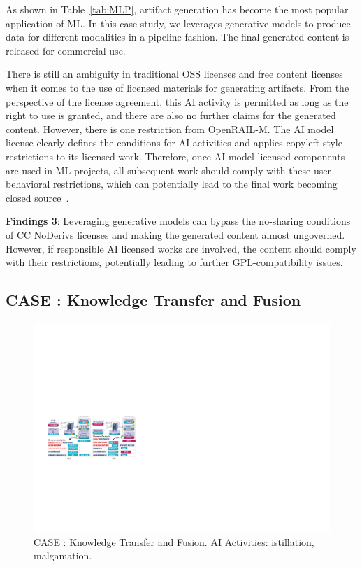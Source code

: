 As shown in Table~\ref{tab:MLP}, artifact generation has become the most popular application of ML.
In this case study, we leverages generative models to produce data for different modalities in a pipeline fashion.
The final generated content is released for commercial use.

There is still an ambiguity in traditional OSS licenses and free content licenses when it comes to the use of licensed materials for generating artifacts.
From the perspective of the license agreement, this AI activity is permitted as long as the right to use is granted, and there are also no further claims for the generated content.
However, there is one restriction from OpenRAIL-M. 
The AI model license clearly defines the conditions for AI activities and applies copyleft-style restrictions to its licensed work. 
Therefore, once AI model licensed components are used in ML projects, all subsequent work should comply with these user behavioral restrictions, which can potentially lead to the final work becoming closed source~\cite{greenbaum2016the}.

\begin{tcolorbox} 
\textbf{Findings 3}: Leveraging generative models can bypass the no-sharing conditions of CC NoDerivs licenses and making the generated content almost ungoverned.
However, if responsible AI licensed works are involved, the content should comply with their restrictions, potentially leading to further GPL-compatibility issues.
\end{tcolorbox}

\subsection{CASE  : Knowledge Transfer and Fusion}

\begin{figure}[h]
    \centering
    \includegraphics[width=\linewidth]{fig/case4.pdf}
    \caption{CASE : Knowledge Transfer and Fusion.  AI Activities: istillation, malgamation.}
    \Description{}
    \label{fig:case4}
\end{figure}

